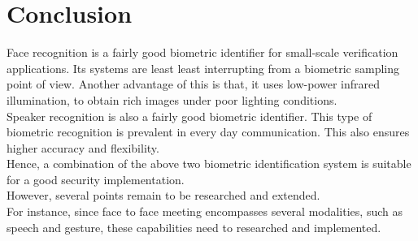 \chapter{Conclusion}

Face recognition is a fairly good biometric identifier for small-scale verification applications. Its systems are least least interrupting from a biometric sampling point of view. Another advantage of this is that, it uses low-power infrared illumination, to obtain rich images under poor lighting conditions. \\
Speaker recognition is also a fairly good biometric identifier. This type of biometric recognition is prevalent in every day communication. This also ensures higher accuracy and flexibility. \\
Hence, a combination of the above two biometric identification system is suitable for a good security implementation. \\
However, several points remain to be researched and extended. \\ 
For instance, since face to face meeting encompasses several modalities, such as
speech and gesture, these capabilities need to researched and implemented. \\
